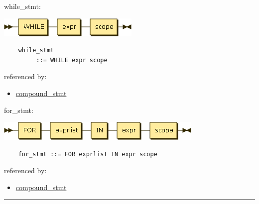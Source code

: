 \begin{minipage}{\textwidth}
    \protect\hypertarget{while_stmt}{}{while\_stmt:}

    \includegraphics[width=2.66667in,height=0.37500in]{diagram/while_stmt.png}

    \begin{verbatim}
    while_stmt
         ::= WHILE expr scope
    \end{verbatim}

    referenced by:

    \begin{itemize}
            \tightlist
        \item
            \protect\hyperlink{compound_stmt}{compound\_stmt}
    \end{itemize}

\end{minipage}

\begin{minipage}{\textwidth}
    \protect\hypertarget{for_stmt}{}{for\_stmt:}

    \includegraphics[width=3.91667in,height=0.37500in]{diagram/for_stmt.png}

    \begin{verbatim}
    for_stmt ::= FOR exprlist IN expr scope
    \end{verbatim}

    referenced by:

    \begin{itemize}
            \tightlist
        \item
            \protect\hyperlink{compound_stmt}{compound\_stmt}
    \end{itemize}
\end{minipage}

\begin{center}\rule{0.5\linewidth}{\linethickness}\end{center}
